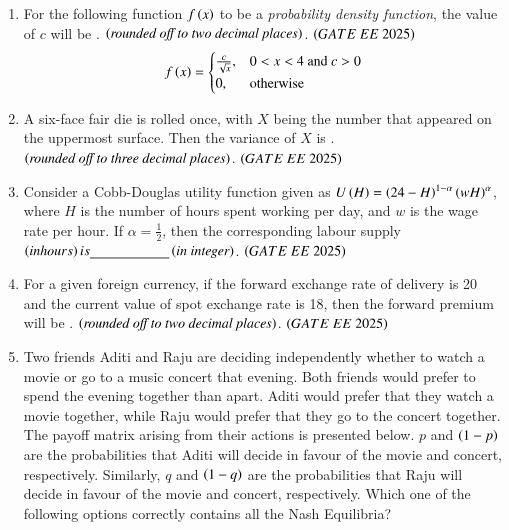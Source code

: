 \documentclass[journal,12pt,onecolumn]{IEEEtran}
\theoremstyle{remark}
\begin{document}
\begin{enumerate}
\item For the following function $f \left(x\right)$ to be a \textit{probability density function}, the value of $c$ will be \underline{\hspace{2cm}}.  $\left(\textit{rounded off to two decimal places}\right)$.
\hfill $\brak{GATE\ EE\ 2025}$  
\begin{align} 
f \left(x\right) =
  \begin{cases}
    \frac{c}{\sqrt{x}}, & 0 < x < 4\text{ and } c > 0 \\
    0, & \text{otherwise}
  \end{cases}
 \end{align}
\item A six-face fair die is rolled once, with $X$ being the number that appeared on the uppermost surface. Then the variance of $X$ is \underline{\hspace{2cm}}.  $\left(\textit{rounded off to three decimal places}\right)$.
 \hfill $\brak{GATE\ EE\ 2025}$
\item Consider a Cobb-Douglas utility function given as $U \left(H\right) =  \left(24-H\right)^{1-\alpha} \left(wH\right)^\alpha$, where $H$ is the number of hours spent working per day, and $w$ is the wage rate per hour. If $\alpha = \frac{1}{2}$, then the corresponding labour supply  $\left(in hours\right) is \underline{\hspace{2cm}}  \left(\textit{in integer}\right)$.
 \hfill $\brak{GATE\ EE\ 2025}$
\item For a given foreign currency, if the forward exchange rate of delivery is 20 and the current value of spot exchange rate is 18, then the forward premium will be \underline{\hspace{2cm}}.  $\left(\textit{rounded off to two decimal places}\right)$.
 \hfill $\brak{GATE\ EE\ 2025}$
\item Two friends Aditi and Raju are deciding independently whether to watch a movie or go to a music concert that evening. Both friends would prefer to spend the evening together than apart. Aditi would prefer that they watch a movie together, while Raju would prefer that they go to the concert together. The payoff matrix arising from their actions is presented below. $p$ and $ \left(1-p\right)$ are the probabilities that Aditi will decide in favour of the movie and concert, respectively. Similarly, $q$ and $ \left(1-q\right)$ are the probabilities that Raju will decide in favour of the movie and concert, respectively. Which one of the following options correctly contains all the Nash Equilibria?\\


\end{enumerate}
\end{document}
